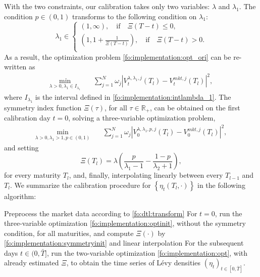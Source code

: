 \documentclass{article}
\numberwithin{equation}{section}
\newcommand\RR {\mathbb R}
\def\bT{\bar{T}}
\begin{document}
With the two constraints, our calibration takes only two variables: $\lambda$ and $\lambda_1$. The condition $p \in (0,1)$ transforms to the following condition on $\lambda_1$:
\begin{equation} \label{fo:implementation:intlambda_1}
\lambda_1 \in \left\{
\begin{array}{c}
{(1,\infty)}, \quad \text{if} \quad \Xi(T-t) \leq 0,\\
{\left(1, 1+\frac{1}{\Xi(T-t)}\right), \quad \text{if} \quad \Xi(T-t) > 0.}\\
\end{array}
\right.
\end{equation}
As a result, the optimization problem \eqref{fo:implementation:opt_ori} can be re-written as
\begin{align}\label{fo:implementation:opt}
\min_{\lambda > 0, \lambda_1 \in I_{\lambda_1}} \quad & \sum_{j=1}^N \omega_j |V_t^{\lambda, \lambda_1, j}(T_l) - V_t^{mkt,j}(T_l)|^2,
\end{align}
where $I_{\lambda_1}$ is the interval defined in \eqref{fo:implementation:intlambda_1}.
The symmetry index function $\Xi(\tau)$, for all $\tau \in \RR_+$, can be obtained on the first calibration day $t=0$, solving a three-variable optimization problem,
\begin{align}\label{fo:implementation:optinit}
\min_{\lambda > 0, \lambda_1 > 1, p \in(0,1)} \quad & \sum_{j=1}^N \omega_j |V_{0}^{\lambda, \lambda_1, p, j}(T_l) - V_{0}^{mkt,j}(T_l)|^2,
\end{align}
and setting
\begin{equation}\label{fo:implementation:symmetryinit} 
\Xi(T_l) = \lambda\left( \frac{p}{\lambda_1 - 1} - \frac{1-p}{\lambda_2 + 1} \right),
\end{equation}
for every maturity $T_l$, and, finally, interpolating linearly between every $T_{l-1}$ and $T_l$.
We summarize the calibration procedure for $\left\{\eta_t(T_l,\cdot) \right\}$ in the following algorithm:


\vspace{5mm}
\begin{algorithm}[H]
\label{algo:implementation:calibration}
\caption{Algorithm for calibrating $\left\{\eta_t(T_l,\cdot) \right\}$}
Preprocess the market data according to \eqref{fo:dtl:transform}\;
For $t=0$, run the three-variable optimization \eqref{fo:implementation:optinit}, without the symmetry condition, for all maturities, and compute $\Xi(\cdot)$ by \eqref{fo:implementation:symmetryinit} and linear interpolation\;
For the subsequent days $t \in (0,\bT]$, run the two-variable optimization \eqref{fo:implementation:opt}, with already estimated $\Xi$, to obtain the time series of L\'{e}vy densities $(\eta_t)_{t \in [0,\bT]}$.
\end{algorithm}
\vspace{5mm}
\end{document}
